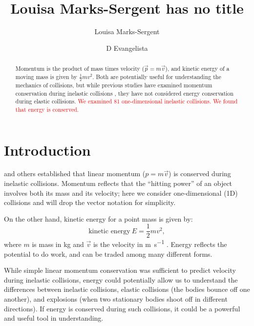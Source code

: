 \documentclass[aps,prl,preprint]{revtex4-1}
\begin{document}
\linenumbers
\title{Louisa Marks-Sergent has no title}
\author{Louisa Marks-Sergent}
\author{D Evangelista}

\newcommand{\student}[1]{{\textcolor{red}{#1}}}

\begin{abstract}
Momentum is the product of mass times velocity ($\vec{p}=m\vec{v}$), and kinetic energy of a moving mass is given by $\frac{1}{2}mv^2$. Both are potentially useful for understanding the mechanics of collisions, but while previous studies have examined momentum conservation during inelastic collisions \cite{ortega-2021-momentum}, they have not considered energy conservation during elastic collisions. \student{We examined 81 one-dimensional inelastic collisions. We found that energy is conserved.}\end{abstract}
\maketitle

\section{Introduction}
\cite{ortega-2021-momentum} and others established that linear momentum ($p=m\vec{v}$) is conserved during inelastic collisions. Momentum reflects that the ``hitting power'' of an object involves both its mass and its velocity; here we consider one-dimensional (1D) collisions and will drop the vector notation for simplicity.  

On the other hand, kinetic energy for a point mass is given by:
\begin{equation}
\text{kinetic energy}\ E = \frac{1}{2} m v^2,
\label{eq:energy}
\end{equation}
where $m$ is mass in \si{\kilo\gram} and $\vec{v}$ is the velocity in \si{\meter\per\second} \cite{duchatelet-1741-reponse, coriolis-1829-calcul}. Energy reflects the potential to do work, and can be traded among many different forms. 

While simple linear momentum conservation was sufficient to predict velocity during inelastic collisions, energy could potentially allow us to understand the differences between  inelastic collisions, elastic collisions (the bodies bounce off one another), and explosions (when two stationary bodies shoot off in different directions). If energy is conserved during such collisions, it could be a powerful and useful tool in understanding.
\end{document}
